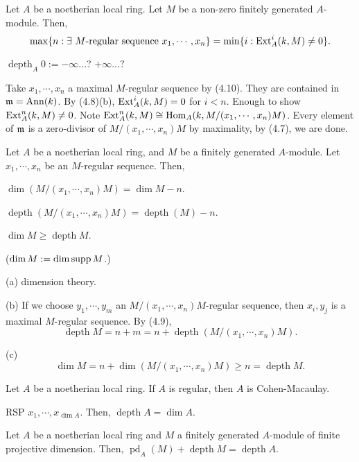 \documentclass{../../../small}
\renewcommand{\pd}{\operatorname{pd}}
\newcommand{\depth}{\operatorname{depth}}
\newcommand{\Ann}{\operatorname{Ann}}
\begin{document}
\begin{thm*}[4.9]
Let $A$ be a noetherian local ring.
Let $M$ be a non-zero finitely generated $A$-module.
Then,
\[\max\{n:\exists\text{ $M$-regular sequence }x_1,\cdots,x_n\}=\min\{i:\operatorname{Ext}_A^i(k,M)\ne0\}.\]
\end{thm*}
\begin{rmk*}
$\depth_A0:=-\infty$...? $+\infty$...?
\end{rmk*}
\begin{pf}
Take $x_1,\cdots,x_n$ a maximal $M$-regular sequence by (4.10).
They are contained in $\fm=\Ann(k)$.
By (4.8)(b), $\operatorname{Ext}_A^i(k,M)=0$ for $i<n$.
Enough to show $\operatorname{Ext}_A^n(k,M)\ne0$.
Note $\operatorname{Ext}_A^n(k,M)\cong\operatorname{Hom}_A(k,M/(x_1,\cdots,x_n)M)$.
Every element of $\mathfrak{m}$ is a zero-divisor of $M/(x_1,\cdots,x_n)M$ by maximality, by (4.7), we are done.
\end{pf}

\begin{thm*}[4.10]
Let $A$ be a noetherian local ring, and $M$ be a finitely generated $A$-module.
Let $x_1,\cdots,x_n$ be an $M$-regular sequence.
Then,
\begin{parts}
\item $\dim(M/(x_1,\cdots,x_n)M)=\dim M-n$.
\item $\depth(M/(x_1,\cdots,x_n)M)=\depth(M)-n$.
\item $\dim M\ge\depth M$.
\end{parts}
($\dim M:=\dim\operatorname{supp} M$.)
\end{thm*}
\begin{pf}
(a) dimension theory.

(b)
If we choose $y_1,\cdots,y_m$ an $M/(x_1,\cdots,x_n)M$-regular sequence, then $x_i,y_j$ is a maximal $M$-regular sequence.
By (4.9),
\[\depth M=n+m=n+\depth(M/(x_1,\cdots,x_n)M).\]

(c)
\[\dim M=n+\dim(M/(x_1,\cdots,x_n)M)\ge n=\depth M.\]
\end{pf}

\begin{cor*}[4.11]
Let $A$ be a noetherian local ring.
If $A$ is regular, then $A$ is Cohen-Macaulay.
\end{cor*}
\begin{pf}
RSP $x_1,\cdots,x_{\dim A}$.
Then, $\depth A=\dim A$.
\end{pf}

\begin{thm*}
Let $A$ be a noetherian local ring and $M$ a finitely generated $A$-module of finite projective dimension.
Then, $\pd_A(M)+\depth M=\depth A$.
\end{thm*}
\end{document}
